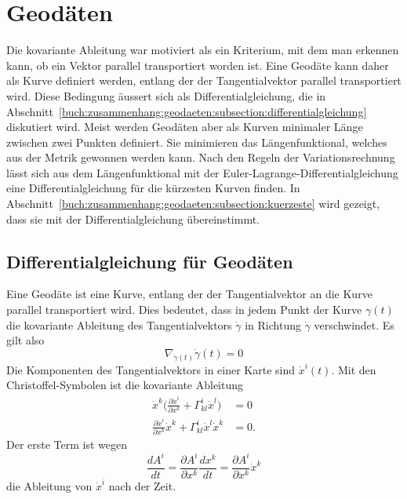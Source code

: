 %
%
%

%
%
\section{Geodäten
\label{buch:zusammenhang:section:geodaeten}}
Die kovariante Ableitung war motiviert als ein Kriterium, mit
dem man erkennen kann, ob ein Vektor parallel transportiert
worden ist.
Eine Geodäte kann daher als Kurve definiert werden, entlang der
der Tangentialvektor parallel transportiert wird.
Diese Bedingung äussert sich als Differentialgleichung, die in
Abschnitt~\ref{buch:zusammenhang:geodaeten:subsection:differentialgleichung}
diskutiert wird.
Meist werden Geodäten aber als Kurven minimaler Länge zwischen zwei Punkten
definiert.
Sie minimieren das Längenfunktional, welches aus der Metrik gewonnen
werden kann.
Nach den Regeln der Variationsrechnung lässt sich aus dem Längenfunktional
mit der Euler-Lagrange-Differentialgleichung eine Differentialgleichung
für die kürzesten Kurven finden.
In Abschnitt~\ref{buch:zusammenhang:geodaeten:subsection:kuerzeste}
wird gezeigt, dass sie mit der Differentialgleichung übereinstimmt.

%
%
\subsection{Differentialgleichung für Geodäten
\label{buch:zusammenhang:geodaeten:subsection:differentialgleichung}}
Eine Geodäte ist eine Kurve, entlang der der Tangentialvektor an die
Kurve parallel transportiert wird.
Dies bedeutet, dass in jedem Punkt der Kurve $\gamma(t)$ die kovariante
Ableitung des Tangentialvektors $\dot{\gamma}$ in Richtung
$\dot{\gamma}$ verschwindet.
Es gilt also
\[
\nabla_{\dot{\gamma}(t)} \dot{\gamma}(t)
=
0
\]
Die Komponenten des Tangentialvektors in einer Karte sind $\dot{x}^i(t)$.
Mit den Christoffel-Symbolen ist die kovariante Ableitung
\begin{align*}
\dot{x}^k
\biggl(
\frac{\partial\dot{x}^i}{\partial x^k}
+
\Gamma^i_{kl}\dot{x}^l
\biggr)
&=
0
\\
\frac{\partial\dot{x}^i}{\partial x^k}
\dot{x}^k
+
\Gamma^i_{kl} \dot{x}^l \dot{x}^k
&=
0.
\end{align*}
Der erste Term ist wegen
\[
\frac{dA^i}{dt}
=
\frac{\partial A^i}{\partial x^k}\frac{dx^k}{dt}
=
\frac{\partial A^i}{\partial x^k}
\dot{x}^k
\]
die Ableitung von $\dot{x}^i$ nach der Zeit.

